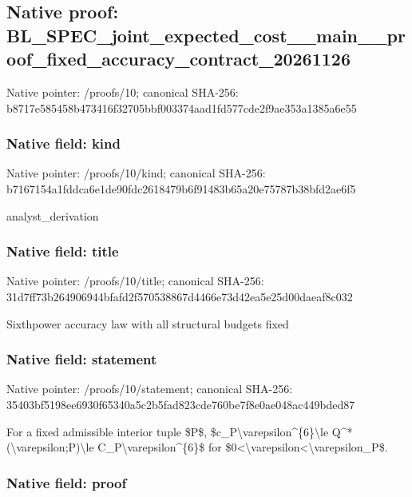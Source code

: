 \documentclass[10pt,a4paper]{article}
\begin{document}
\subsection{Native proof: BL\_SPEC\_joint\_expected\_c\allowbreak{}ost\_\_main\_\_proof\_fixed\_a\allowbreak{}ccuracy\_contract\_2026112\allowbreak{}6}


Native pointer: /proofs/10; canonical SHA-256: b8717e585458b473416f3270\allowbreak{}5bbf003374aad1fd577cde2f\allowbreak{}9ae353a1385a6e55



\subsubsection{Native field: kind}


Native pointer: /proofs/10/kind; canonical SHA-256: b7167154a1fddca6e1de90fd\allowbreak{}c2618479b6f91483b65a20e7\allowbreak{}5787b38bfd2ae6f5


analyst\_derivation


\subsubsection{Native field: title}


Native pointer: /proofs/10/title; canonical SHA-256: 31d7ff73b264906944bfafd2\allowbreak{}f570538867d4466e73d42ea5\allowbreak{}e25d00daeaf8c032


Sixthpower accuracy law with all structural budgets fixed


\subsubsection{Native field: statement}


Native pointer: /proofs/10/statement; canonical SHA-256: 35403bf5198ee6930f65340a\allowbreak{}5c2b5fad823cde760be7f8e0\allowbreak{}ae048ac449bded87


For a fixed admissible interior tuple \$P\$, \$c\_P\textbackslash{}varepsilon\textasciicircum{}\{6\}\textbackslash{}le Q\textasciicircum{}*(\textbackslash{}varepsilon;P)\textbackslash{}le C\_P\textbackslash{}varepsilon\textasciicircum{}\{6\}\$ for \$0<\textbackslash{}varepsilon<\textbackslash{}varepsilon\_P\$.


\subsubsection{Native field: proof}
\end{document}
